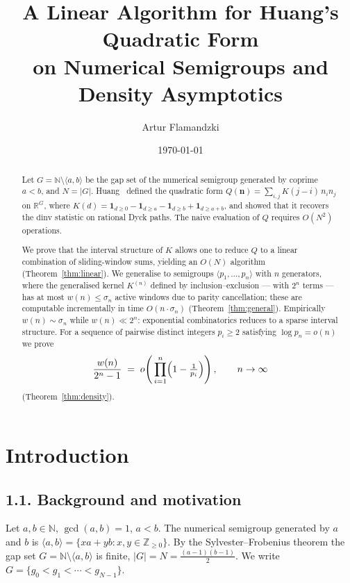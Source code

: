 \documentclass[11pt,a4paper]{amsart}
\title{A Linear Algorithm for Huang's Quadratic Form\\
on Numerical Semigroups and Density Asymptotics}
\author{Artur Flamandzki}
\date{\today}
\theoremstyle{plain}
\theoremstyle{definition}
\theoremstyle{remark}
\begin{document}
\begin{abstract}
Let $G = \mathbb{N} \setminus \langle a, b \rangle$ be the gap set
of the numerical semigroup generated by coprime $a < b$, and $N = |G|$.
Huang~\cite{Huang2026} defined the quadratic form
$Q(\mathbf{n}) = \sum_{i,j} K(j-i)\,n_i n_j$ on $\mathbb{R}^G$, where
$K(d) = \mathbf{1}_{d \geq 0} - \mathbf{1}_{d \geq a} - \mathbf{1}_{d \geq b}
+ \mathbf{1}_{d \geq a+b}$, and showed that it recovers the
$\mathrm{dinv}$ statistic on rational Dyck paths.
The naive evaluation of $Q$ requires $O(N^2)$ operations.

We prove that the interval structure of $K$ allows one to reduce $Q$
to a linear combination of sliding-window sums, yielding an $O(N)$
algorithm (Theorem~\ref{thm:linear}). We generalise to semigroups
$\langle p_1,\ldots,p_n \rangle$ with $n$ generators, where the
generalised kernel $K^{(n)}$ defined by inclusion--exclusion
--- with $2^n$ terms --- has at most $w(n) \leq \sigma_n$
active windows due to parity cancellation;
these are computable incrementally in time $O(n \cdot \sigma_n)$
(Theorem~\ref{thm:general}).
Empirically $w(n) \sim \sigma_n$ while $w(n) \ll 2^n$:
exponential combinatorics reduces to a sparse interval structure.
For a sequence of pairwise distinct integers $p_i \geq 2$ satisfying
$\log p_n = o(n)$ we prove
\[
  \frac{w(n)}{2^n - 1} \;=\; o\!\left(\,\prod_{i=1}^{n}
    \Bigl(1 - \tfrac{1}{p_i}\Bigr)\right), \qquad n \to \infty
\]
(Theorem~\ref{thm:density}).
\end{abstract}

\maketitle

\section{Introduction}
\label{sec:intro}

\subsection*{1.1. Background and motivation}

Let $a, b \in \mathbb{N}$, $\gcd(a,b) = 1$, $a < b$.
The numerical semigroup generated by $a$ and $b$ is
$\langle a, b \rangle = \{ xa + yb : x, y \in \mathbb{Z}_{\geq 0} \}$.
By the Sylvester--Frobenius theorem the gap set
$G = \mathbb{N} \setminus \langle a, b \rangle$ is finite,
$|G| = N = \tfrac{(a-1)(b-1)}{2}$.
We write $G = \{g_0 < g_1 < \cdots < g_{N-1}\}$.
\end{document}
